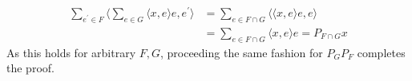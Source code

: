 \documentclass[a4paper,12pt]{article} %
\newcommand{\comment}[1]{%
  \text{\phantom{(#1)}} \tag{#1}
}
\begin{document}
\begin{align*}
    \sum_{e^{\prime}  \in F} \langle \sum_{e \in  G}\langle x,e \rangle e   ,e^{\prime} \rangle & = \sum_{ e \in  F \cap G}\langle \langle x,e \rangle e,e  \rangle \\
                                                                                                & = \sum_{e \in  F \cap G} \langle x,e \rangle  e = P_{F \cap G}x
\end{align*}
As this holds for arbitrary \(F, G\), proceeding the same fashion for \(P_G P_F\) completes the proof.






\end{document}
